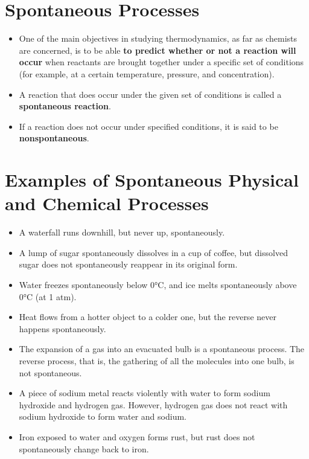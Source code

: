 \documentclass[a4paper,12pt,twocolumn]{article}
\begin{document}
\section{Spontaneous Processes}
\begin{itemize}
\item One of the main objectives in studying thermodynamics, as far as chemists are concerned, is to be able \textbf{to predict whether or not a reaction will occur} when reactants are brought together under a specific set of conditions (for example, at a certain temperature, pressure, and concentration).
\item A reaction that does occur under the given set of conditions is called a \textbf{spontaneous reaction}. 
\item If a reaction does not occur under specified conditions, it is said to be \textbf{nonspontaneous}.
\end{itemize}

\section{Examples of Spontaneous Physical and Chemical Processes}
\begin{itemize}
\item A waterfall runs downhill, but never up, spontaneously.
\item A lump of sugar spontaneously dissolves in a cup of coffee, but dissolved sugar does not spontaneously reappear in its original form.
\item Water freezes spontaneously below 0°C, and ice melts spontaneously above 0°C (at 1 atm).
\item Heat flows from a hotter object to a colder one, but the reverse never happens spontaneously.
\item The expansion of a gas into an evacuated bulb is a spontaneous process. The reverse process, that is, the gathering of all the molecules into one bulb, is not spontaneous.
\item A piece of sodium metal reacts violently with water to form sodium hydroxide and hydrogen gas. However, hydrogen gas does not react with sodium hydroxide to form water and sodium.
\item Iron exposed to water and oxygen forms rust, but rust does not spontaneously change back to iron.
\end{itemize}
\end{document}
